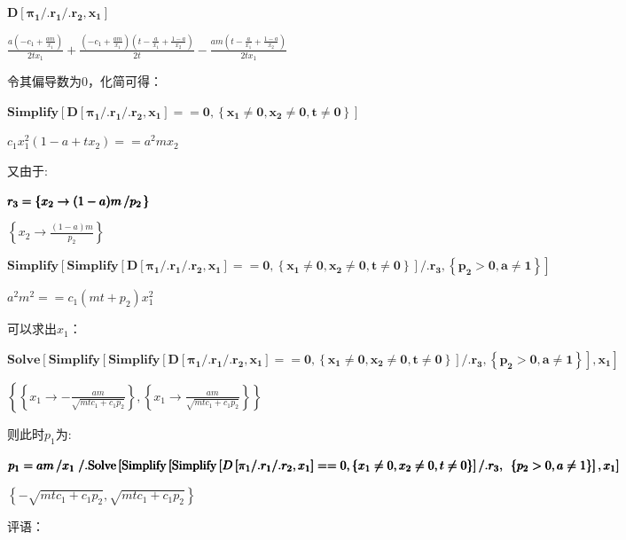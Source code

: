 \documentclass[paper=a4, fontsize=10.5pt]{scrartcl} %
\numberwithin{equation}{section} %
\numberwithin{figure}{section} %
\numberwithin{table}{section} %
\begin{document}
\begin{CJK}{UTF8}{gbsn}
\(\pmb{D\left[\pi _1 \text{/.} r_1 \text{/.}r_2,x_1\right]}\)


\(\frac{a \left(-c_1+\frac{a m}{x_1}\right)}{2 t x_1}+\frac{\left(-c_1+\frac{a m}{x_1}\right) \left(t-\frac{a}{x_1}+\frac{1-a}{x_2}\right)}{2
		t}-\frac{a m \left(t-\frac{a}{x_1}+\frac{1-a}{x_2}\right)}{2 t x_1}\)


令其偏导数为0，化简可得：

\(\pmb{\text{Simplify}\left[D\left[\pi _1 \text{/.} r_1 \text{/.}r_2,x_1\right]==0,\left\{x_1\neq 0,x_2\neq 0,t\neq 0\right\}\right]}\)


\(c_1 x_1^2 \left(1-a+t x_2\right)==a^2 m x_2\)


又由于:

\(\pmb{r_3 = \left\{x_2 \to  (1-a)m\left/p_2\right.\right\}}\)


\(\left\{x_2\to \frac{(1-a) m}{p_2}\right\}\)


\(\pmb{\text{Simplify}\left[\text{Simplify}\left[D\left[\pi _1 \text{/.} r_1 \text{/.}r_2,x_1\right]==0,\left\{x_1\neq 0,x_2\neq 0,t\neq
		0\right\}\right]\text{/.}r_3,\right.}
	\pmb{\left.\left\{p_2>0,a\neq 1\right\}\right]}\)


\(a^2 m^2==c_1 \left(m t+p_2\right) x_1^2\)


可以求出$x_1$：

\(\pmb{\text{Solve}\left[\text{Simplify}\left[\text{Simplify}\left[D\left[\pi _1 \text{/.} r_1 \text{/.}r_2,x_1\right]==0,\left\{x_1\neq
		0,x_2\neq 0,t\neq 0\right\}\right]\text{/.}r_3,\right.\right.}
	\pmb{\left.\left.\left\{p_2>0,a\neq 1\right\}\right],x_1\right]}\)


\(\left\{\left\{x_1\to -\frac{a m}{\sqrt{m t c_1+c_1 p_2}}\right\},\left\{x_1\to \frac{a m}{\sqrt{m t c_1+c_1 p_2}}\right\}\right\}\)


则此时$p_1$为:

\(\pmb{p_1 = }
	\pmb{a m \left/x_1\right. \text{/.} }
	\pmb{\text{Solve}\left[\text{Simplify}\left[\text{Simplify}\left[D\left[\pi _1 \text{/.} r_1 \text{/.}r_2,x_1\right]==0,\left\{x_1\neq 0,x_2\neq
		0,t\neq 0\right\}\right]\text{/.}r_3,\right.\right.}
	\pmb{\left.\left.\left\{p_2>0,a\neq 1\right\}\right],x_1\right]}\)


\(\left\{-\sqrt{m t c_1+c_1 p_2},\sqrt{m t c_1+c_1 p_2}\right\}\)


\vspace{2cm}
\hspace{10cm}评语：

\end{CJK}
\end{document}
